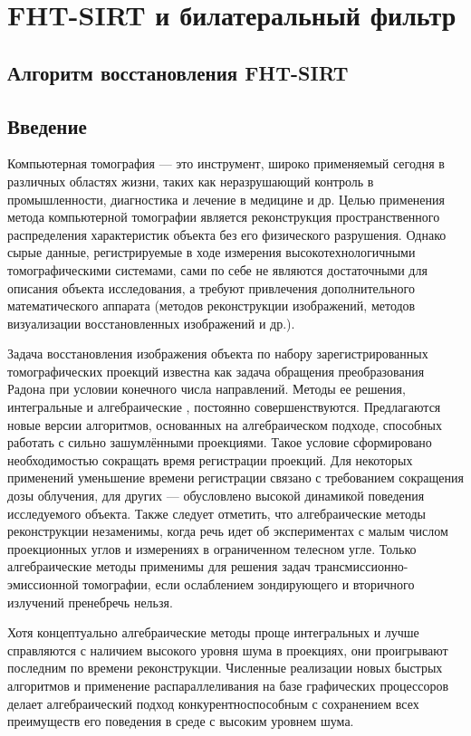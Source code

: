 \chapter{FHT-SIRT и билатеральный фильтр} \label{chapt1}

\section{Алгоритм восстановления FHT-SIRT} \label{sect1_1}

\section{Введение}

Компьютерная томография --- это инструмент, широко применяемый сегодня в различных областях жизни, таких как неразрушающий контроль в промышленности, диагностика и лечение  в медицине и др. Целью применения метода компьютерной томографии является реконструкция пространственного распределения характеристик объекта без его физического разрушения. Однако сырые данные, регистрируемые в ходе измерения высокотехнологичными томографическими системами, сами по себе не являются достаточными для описания объекта исследования, а требуют привлечения дополнительного математического аппарата (методов реконструкции изображений, методов визуализации восстановленных изображений и др.). 

Задача восстановления изображения объекта по набору зарегистрированных томографических проекций известна как задача обращения преобразования Радона при условии конечного числа направлений. Методы ее решения, интегральные и алгебраические \cite{algebraic_methods}, постоянно совершенствуются. Предлагаются новые версии алгоритмов, основанных на алгебраическом подходе, способных работать с сильно зашумлёнными проекциями. Такое условие сформировано необходимостью сокращать время регистрации проекций. Для некоторых применений уменьшение времени регистрации связано с требованием сокращения дозы облучения, для других --- обусловлено высокой динамикой поведения исследуемого объекта. Также следует отметить, что алгебраические методы реконструкции незаменимы, когда речь идет об экспериментах с малым числом проекционных углов и измерениях в ограниченном телесном угле. Только алгебраические методы применимы для решения задач трансмиссионно-эмиссионной томографии, если ослаблением зондирующего и вторичного излучений пренебречь нельзя.

Хотя концептуально алгебраические методы проще интегральных и лучше справляются с наличием высокого уровня шума в проекциях, они проигрывают последним по времени реконструкции. Численные реализации новых быстрых алгоритмов и применение распараллеливания на базе графических процессоров делает алгебраический подход конкурентноспособным с сохранением всех преимуществ его поведения в среде с высоким уровнем шума.

